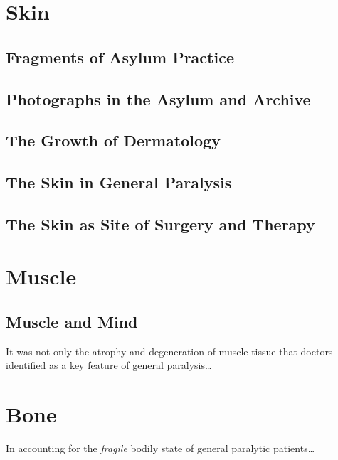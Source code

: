 \documentclass[
  openany]{book}
\begin{document}
\hypertarget{skin}{%
\chapter{Skin}\label{skin}}

\hypertarget{fragments-of-asylum-practice}{%
\section{Fragments of Asylum Practice}\label{fragments-of-asylum-practice}}

\hypertarget{photographs-in-the-asylum-and-archive}{%
\section{Photographs in the Asylum and Archive}\label{photographs-in-the-asylum-and-archive}}

\hypertarget{the-growth-of-dermatology}{%
\section{The Growth of Dermatology}\label{the-growth-of-dermatology}}

\hypertarget{the-skin-in-general-paralysis}{%
\section{The Skin in General Paralysis}\label{the-skin-in-general-paralysis}}

\hypertarget{the-skin-as-site-of-surgery-and-therapy}{%
\section{The Skin as Site of Surgery and Therapy}\label{the-skin-as-site-of-surgery-and-therapy}}

\hypertarget{muscle}{%
\chapter{Muscle}\label{muscle}}

\hypertarget{muscle-and-mind}{%
\section{Muscle and Mind}\label{muscle-and-mind}}

It was not only the atrophy and degeneration of muscle tissue that doctors identified as a key feature of general paralysis\ldots{}

\hypertarget{bone}{%
\chapter{Bone}\label{bone}}

In accounting for the \emph{fragile} bodily state of general paralytic patients\ldots{}
\end{document}

